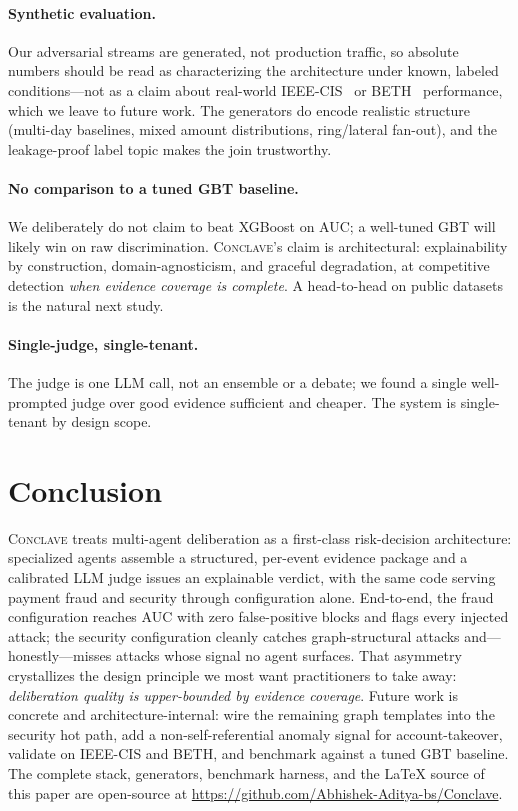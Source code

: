 \documentclass[sigconf,nonacm,screen]{acmart}
\begin{document}
\paragraph{Synthetic evaluation.}
Our adversarial streams are generated, not production traffic, so absolute
numbers should be read as characterizing the architecture under known, labeled
conditions---not as a claim about real-world IEEE-CIS~\cite{ieeecis2019} or
BETH~\cite{highnam2021beth} performance, which we leave to future work. The
generators do encode realistic structure (multi-day baselines, mixed amount
distributions, ring/lateral fan-out), and the leakage-proof label topic makes the
join trustworthy.

\paragraph{No comparison to a tuned GBT baseline.}
We deliberately do not claim to beat XGBoost on AUC; a well-tuned GBT will likely
win on raw discrimination. \textsc{Conclave}'s claim is architectural:
explainability by construction, domain-agnosticism, and graceful degradation, at
competitive detection \emph{when evidence coverage is complete}. A head-to-head on
public datasets is the natural next study.

\paragraph{Single-judge, single-tenant.}
The judge is one LLM call, not an ensemble or a debate; we found a single
well-prompted judge over good evidence sufficient and cheaper. The system is
single-tenant by design scope.

\section{Conclusion}

\textsc{Conclave} treats multi-agent deliberation as a first-class risk-decision
architecture: specialized agents assemble a structured, per-event evidence
package and a calibrated LLM judge issues an explainable verdict, with the same
code serving payment fraud and security through configuration alone. End-to-end,
the fraud configuration reaches AUC \fraudauc{} with zero false-positive blocks
and flags every injected attack; the security configuration cleanly catches
graph-structural attacks and---honestly---misses attacks whose signal no agent
surfaces. That asymmetry crystallizes the design principle we most want
practitioners to take away: \emph{deliberation quality is upper-bounded by
evidence coverage}. Future work is concrete and architecture-internal: wire the
remaining graph templates into the security hot path, add a non-self-referential
anomaly signal for account-takeover, validate on IEEE-CIS and BETH, and benchmark
against a tuned GBT baseline. The complete stack, generators, benchmark harness,
and the \LaTeX{} source of this paper are open-source at
\url{https://github.com/Abhishek-Aditya-bs/Conclave}.



\end{document}
